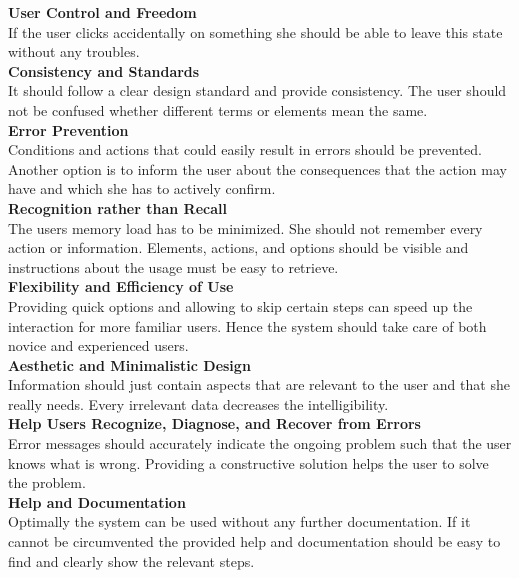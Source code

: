 \textbf{User Control and Freedom}\\
If the user clicks accidentally on something she should be able to leave this state without any troubles.\\

\textbf{Consistency and Standards}\\
It should follow a clear design standard and provide consistency. The user should not be confused whether different terms or elements mean the same.\\

\textbf{Error Prevention}\\
Conditions and actions that could easily result in errors should be prevented. Another option is to inform the user about the consequences that the action may have and which she has to actively confirm.\\

\textbf{Recognition rather than Recall}\\
The users memory load has to be minimized. She should not remember every action or information. Elements, actions, and options should be visible and instructions about the usage must be easy to retrieve.\\

\textbf{Flexibility and Efficiency of Use}\\
Providing quick options and allowing to skip certain steps can speed up the interaction for more familiar users. Hence the system should take care of both novice and experienced users.\\

\textbf{Aesthetic and Minimalistic Design}\\
Information should just contain aspects that are relevant to the user and that she really needs. Every irrelevant data decreases the intelligibility.\\

\textbf{Help Users Recognize, Diagnose, and Recover from Errors}\\
Error messages should accurately indicate the ongoing problem such that the user knows what is wrong. Providing a constructive solution helps the user to solve the problem.\\

\textbf{Help and Documentation}\\
Optimally the system can be used without any further documentation. If it cannot be circumvented the provided help and documentation should be easy to find and clearly show the relevant steps.
\\

